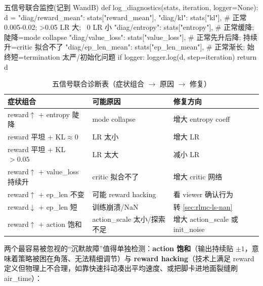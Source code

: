 \begin{codebox}[Python]{五信号联合监控(记到 WandB)}
def log_diagnostics(stats, iteration, logger=None):
    d = {
        "diag/reward_mean": stats["reward_mean"],
        "diag/kl":          stats["kl"],          # 正常 0.005-0.02; >0.05 LR 大; ~0 LR 小
        "diag/entropy":     stats["entropy"],     # 正常缓降; 陡降=mode collapse
        "diag/value_loss":  stats["value_loss"],  # 正常先升后降; 持续升=critic 拟合不了
        "diag/ep_len_mean": stats["ep_len_mean"], # 正常渐长; 始终短=termination 太严/初始化问题
    }
    if logger: logger.log(d, step=iteration)
    return d
\end{codebox}

\begin{table}[H]\centering\small
\caption{五信号联合诊断表（症状组合 $\to$ 原因 $\to$ 修复）}
\label{tab:rlmc-ls-five-signals}
\begin{tabular}{@{}p{4.6cm}p{3.6cm}p{3.4cm}@{}}
\toprule
症状组合 & 可能原因 & 修复方向 \\
\midrule
reward$\uparrow$ + entropy 陡降 & mode collapse & 增大 entropy coeff \\
reward 平坦 + KL$\approx0$ & LR 太小 & 增大 LR \\
reward 平坦 + KL$>0.05$ & LR 太大 & 减小 LR \\
reward$\uparrow$ + value\_loss 持续升 & critic 拟合不了 & 增大 critic 网络 \\
reward$\uparrow$ + ep\_len 不变 & 可能 reward hacking & 看 viewer 确认行为 \\
reward$\downarrow$ + ep\_len 短 & 训练崩溃/NaN & 转 \cref{sec:rlmc-ls-nan} \\
reward$\uparrow$ + action 饱和 & action\_scale 太小/探索不足 & 增大 action\_scale 或 init\_noise \\
\bottomrule
\end{tabular}
\end{table}

两个最容易被忽视的“沉默故障”值得单独检测：\textbf{action 饱和}（输出持续贴 $\pm1$，意味着策略被困在角落、无法精细调节）与 \textbf{reward hacking}（技术上满足 reward 定义但物理上不合理，如靠快速抖动凑出平均速度、或把脚卡进地面裂缝刷 air\_time）：

